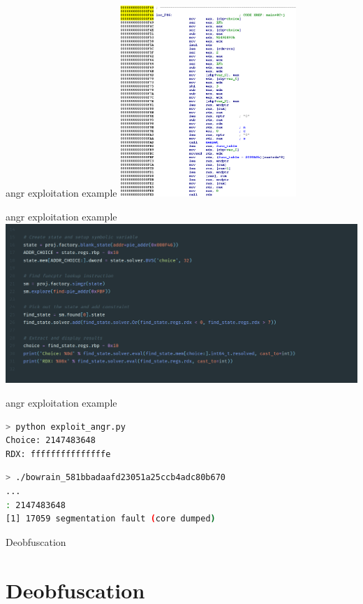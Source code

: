 \documentclass[10pt, compress]{beamer}
\begin{document}
\begin{frame}{angr exploitation example}
  \includegraphics[width=0.5\textwidth]{images/exploit-2-ida2.png}
\end{frame}

\begin{frame}{angr exploitation example}
  \includegraphics[width=\textwidth]{images/exploit-1-angr-b.png}
\end{frame}

\begin{frame}[fragile]{angr exploitation example}

\begin{lstlisting}[language=bash]
> python exploit_angr.py
Choice: 2147483648
RDX: fffffffffffffffe
\end{lstlisting}

\begin{lstlisting}[language=bash]
> ./bowrain_581bbadaafd23051a25ccb4adc80b670
...
: 2147483648
[1] 17059 segmentation fault (core dumped)
\end{lstlisting}

\end{frame}


\begin{frame}{Deobfuscation}
\section{Deobfuscation}
\end{frame}
\end{document}
